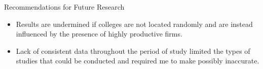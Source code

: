 \documentclass{beamer}
\begin{document}
\begin{frame}{Recommendations for Future Research}
\begin{itemize}
\item Results are undermined if colleges are not located randomly and are instead influenced by the presence of highly productive firms.
\item Lack of consistent data throughout the period of study limited the types of studies that could be conducted and required me to make possibly inaccurate.
\end{itemize}
\end{frame}
\end{document}

